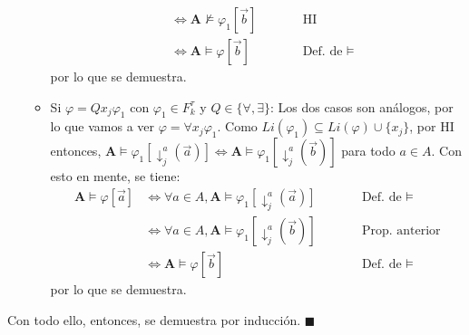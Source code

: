 \documentclass{article}
\begin{document}
\begin{itemize}
\begin{itemize}
\begin{equation*}
\begin{alignedat}{2}
                                                     & \iff \mathbf{A}\nvDash\varphi_1[\vec{b}] &  & \qquad\text{HI}             \\
                                                     & \iff \mathbf{A}\vDash\varphi[\vec{b}]    &  & \qquad\text{Def. de }\vDash
                  \end{alignedat}
                \end{equation*}
                por lo que se demuestra.
          \item Si $\varphi=Qx_j\varphi_1$ con $\varphi_1\in F^\tau_k$ y $Q\in\{\forall,\exists\}$: Los dos casos son análogos, por lo que vamos a ver $\varphi=\forall x_j\varphi_1$. Como $Li(\varphi_1)\subseteq Li(\varphi)\cup\{x_j\}$, por HI entonces, $\mathbf{A}\vDash\varphi_1[\downarrow^a_j(\vec{a})]\iff\mathbf{A}\vDash\varphi_1[\downarrow^a_j(\vec{b})]$ para todo $a\in A$. Con esto en mente, se tiene:
                \begin{equation*}
                  \begin{alignedat}{2}
                    \mathbf{A}\vDash\varphi[\vec{a}] & \iff \forall a\in A,\mathbf{A}\vDash\varphi_1[\downarrow^a_j(\vec{a})] &  & \qquad\text{Def. de }\vDash \\
                                                     & \iff \forall a\in A,\mathbf{A}\vDash\varphi_1[\downarrow^a_j(\vec{b})] &  & \qquad\text{Prop. anterior} \\
                                                     & \iff \mathbf{A}\vDash\varphi[\vec{b}]                                  &  & \qquad\text{Def. de }\vDash
                  \end{alignedat}
                \end{equation*}
                por lo que se demuestra.
        \end{itemize}
\end{itemize}

Con todo ello, entonces, se demuestra por inducción. $\blacksquare$
\end{document}
